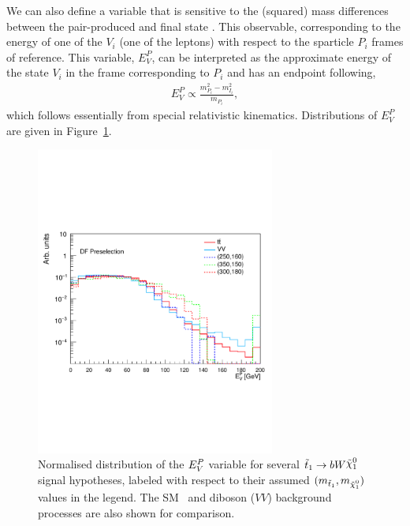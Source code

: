 We can also define a variable that is sensitive to the (squared) mass differences between the pair-produced
\stopone and final state \ninoone.
This observable, corresponding to the energy of one of the $V_i$ (one of the leptons) with respect to the sparticle $P_i$ frames
of reference.
This variable, $E_V^P$, can be interpreted as the approximate energy of the state $V_i$ in the frame
corresponding to $P_i$ and has an endpoint following,
\begin{align}
    E_V^P \propto \frac{
        m_{P_i}^2 - m_{I_i}^2
    }
    {
        m_{P_i}
    },
    \label{eq:mdr_endpoint}
\end{align}
which follows essentially from special relativistic kinematics.
Distributions of $E_V^P$ are given in Figure~\ref{fig:rjr_MDR}.

\begin{figure}[!htb]
    \begin{center}
        \includegraphics[width=0.7\textwidth]{figures/search_stop2l/strategy/comp_plots/dfpresel_MDR}
        \caption{
            Normalised distribution of the $E_V^P$ variable for several $\stopone \rightarrow b W \ninoone$
            signal hypotheses, labeled with respect to their assumed $(m_{\stopone}, m_{\ninoone})$ values in the
            legend.
            The SM \ttbar~and diboson ($VV$) background processes are also shown for comparison.
        }
        \label{fig:rjr_MDR}
    \end{center}
\end{figure}

